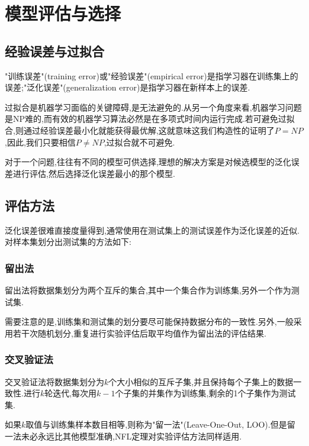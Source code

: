 \chapter{模型评估与选择}

\section{经验误差与过拟合}

"训练误差"(training error)或"经验误差"(empirical error)是指学习器在训练集上的误差;"泛化误差"(generalization error)是指学习器在新样本上的误差.

过拟合是机器学习面临的关键障碍,是无法避免的.从另一个角度来看,机器学习问题是NP难的,而有效的机器学习算法必然是在多项式时间内运行完成.若可避免过拟合,则通过经验误差最小化就能获得最优解,这就意味这我们构造性的证明了$P=NP$,因此,我们只要相信$P\ne NP$,过拟合就不可避免.

对于一个问题,往往有不同的模型可供选择,理想的解决方案是对候选模型的泛化误差进行评估,然后选择泛化误差最小的那个模型.

\section{评估方法}

泛化误差很难直接度量得到,通常使用在测试集上的测试误差作为泛化误差的近似.对样本集划分出测试集的方法如下:

\subsection{留出法}

留出法将数据集划分为两个互斥的集合,其中一个集合作为训练集,另外一个作为测试集.

需要注意的是,训练集和测试集的划分要尽可能保持数据分布的一致性.另外,一般采用若干次随机划分,重复进行实验评估后取平均值作为留出法的评估结果.

\subsection{交叉验证法}

交叉验证法将数据集划分为$k$个大小相似的互斥子集,并且保持每个子集上的数据一致性.进行$k$轮迭代,每次用$k-1$个子集的并集作为训练集,剩余的1个子集作为测试集.

如果$k$取值与训练集样本数目相等,则称为"留一法"(Leave-One-Out, LOO).但是留一法未必永远比其他模型准确,NFL定理对实验评估方法同样适用.

